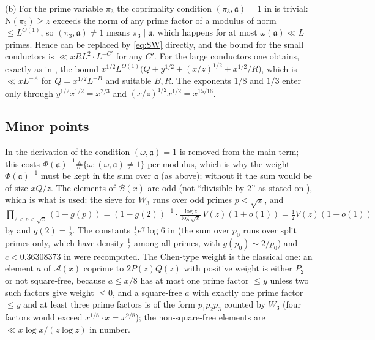 \documentclass[11pt]{amsart}
\theoremstyle{remark}
\newcommand{\N}{\mathrm{N}}
\newcommand{\fa}{\mathfrak{a}}
\begin{document}
(b) For the prime variable $\pi_3$ the coprimality condition $(\pi_3,\fa)=1$ in \cite[(5.5)]{IJU} is trivial: $\N(\pi_3)\ge z$ exceeds the norm of any prime factor of a modulus of norm $\le L^{O(1)}$, so $(\pi_3,\fa)\neq1$ means $\pi_3\mid\fa$, which happens for at most $\omega(\fa)\ll L$ primes. Hence \cite[Lemma~5.2]{IJU} can be replaced by \eqref{eq:SW} directly, and the bound for the small conductors is $\ll xRL^{2}\cdot L^{-C'}$ for any $C'$. For the large conductors one obtains, exactly as in \cite[(5.8)]{IJU}, the bound $x^{1/2}L^{O(1)}\bigl(Q+y^{1/2}+(x/z)^{1/2}+x^{1/2}/R\bigr)$, which is $\ll xL^{-A}$ for $Q=x^{1/2}L^{-B}$ and suitable $B,R$. The exponents $1/8$ and $1/3$ enter only through $y^{1/2}x^{1/2}=x^{2/3}$ and $(x/z)^{1/2}x^{1/2}=x^{15/16}$.

\subsection{Minor points}
In the derivation of \cite[(5.9)]{IJU} the condition $(\omega,\fa)=1$ is removed from the main term; this costs $\Phi(\fa)^{-1}\#\{\omega:(\omega,\fa)\ne1\}$ per modulus, which is why the weight $\Phi(\fa)^{-1}$ must be kept in the sum over $\fa$ (as above); without it the sum would be of size $xQ/z$. The elements of $\mathcal B(x)$ are odd (not ``divisible by $2$'' as stated on \cite[p.~830]{IJU}), which is what is used: the sieve for $W_3$ runs over odd primes $p<\sqrt x$, and $\prod_{2<p<\sqrt x}(1-g(p))=(1-g(2))^{-1}\cdot\frac{\log z}{\log\sqrt x}\,V(z)(1+o(1))=\frac12V(z)(1+o(1))$ by \cite[(3.10)]{IJU} and $g(2)=\frac12$. The constants $\frac12e^{\gamma}\log 6$ in \cite[(4.3)]{IJU} (the sum over $p_0$ runs over split primes only, which have density $\frac12$ among all primes, with $g(p_0)\sim 2/p_0$) and $c<0.36308373$ in \cite[(5.10)]{IJU} were recomputed. The Chen-type weight \cite[(2.2)]{IJU} is the classical one: an element $a$ of $\mathcal A(x)$ coprime to $2P(z)Q(z)$ with positive weight is either $P_2$ or not square-free, because $a\le x/8$ has at most one prime factor $\le y$ unless two such factors give weight $\le 0$, and a square-free $a$ with exactly one prime factor $\le y$ and at least three prime factors is of the form $p_1p_2p_3$ counted by $W_3$ (four factors would exceed $x^{1/8}\cdot x=x^{9/8}$); the non-square-free elements are $\ll x\log x/(z\log z)$ in number.
\end{document}
